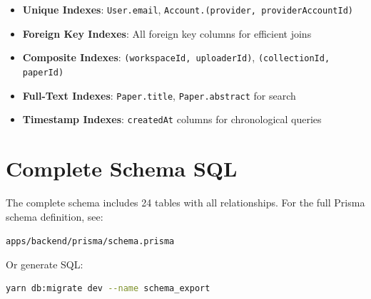 \begin{itemize}[leftmargin=*,topsep=3pt,itemsep=2pt]
\begin{lstlisting}[language=SQL, caption={Paper Table Schema}]
  ON "Paper" USING gin(to_tsvector('english', title || ' ' || authors));

\begin{itemize}[leftmargin=*,topsep=3pt,itemsep=2pt]\end{lstlisting}

    \item \textbf{Unique Indexes}: \texttt{User.email}, \texttt{Account.(provider, providerAccountId)}

    \item \textbf{Foreign Key Indexes}: All foreign key columns for efficient joins%

    \item \textbf{Composite Indexes}: \texttt{(workspaceId, uploaderId)}, \texttt{(collectionId, paperId)}%

    \item \textbf{Full-Text Indexes}: \texttt{Paper.title}, \texttt{Paper.abstract} for search%

    \item \textbf{Timestamp Indexes}: \texttt{createdAt} columns for chronological queries%

\end{itemize}%


\section{Complete Schema SQL}
\label{sec:schema-complete-sql}

\begin{infobox}
The complete schema includes 24 tables with all relationships. For the full Prisma schema definition, see:

\texttt{apps/backend/prisma/schema.prisma}

Or generate SQL:
\begin{lstlisting}[language=bash]
yarn db:migrate dev --name schema_export
\end{lstlisting}
\end{infobox}
